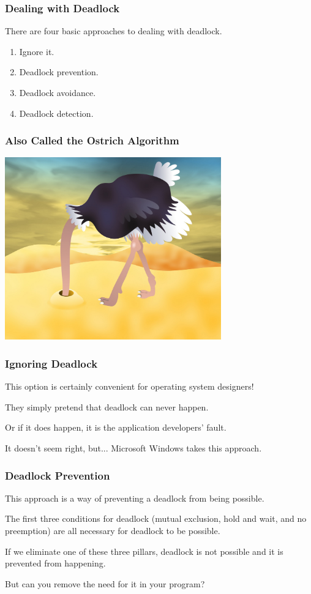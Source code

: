 \begin{frame}
	\frametitle{Dealing with Deadlock}

	There are four basic approaches to dealing with deadlock.

	\begin{enumerate}
		\item Ignore it.
		\item Deadlock prevention.
		\item Deadlock avoidance.
		\item Deadlock detection.
	\end{enumerate}

\end{frame}


\begin{frame}
	\frametitle{Also Called the Ostrich Algorithm}

	\begin{center}
		\includegraphics[width=0.7\textwidth]{images/ostrich-head-sand.jpg}
	\end{center}


\end{frame}


\begin{frame}
	\frametitle{Ignoring Deadlock}

	This option is certainly convenient for operating system designers!

	They simply pretend that deadlock can never happen.

	Or if it does happen, it is the application developers' fault.

	It doesn't seem right, but... Microsoft Windows takes this approach.

\end{frame}

\begin{frame}
	\frametitle{Deadlock Prevention}

	This approach is a way of preventing a deadlock from being possible.

	The first three conditions for deadlock (mutual exclusion, hold and wait, and no preemption) are all necessary for deadlock to be possible.

	If we eliminate one of these three pillars, deadlock is not possible and it is prevented from happening.

	But can you remove the need for it in your program?

\end{frame}

